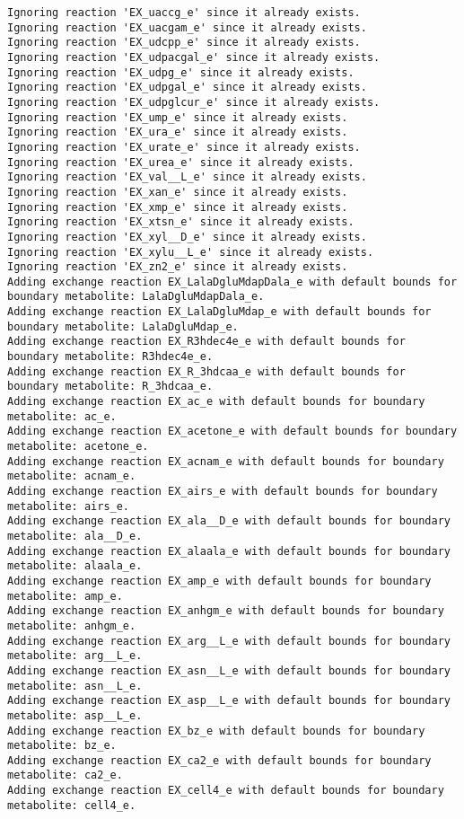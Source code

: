 \documentclass[
  letterpaper,
  DIV=11,
  numbers=noendperiod]{scrartcl}
\begin{document}
\begin{verbatim}
Ignoring reaction 'EX_uaccg_e' since it already exists.
Ignoring reaction 'EX_uacgam_e' since it already exists.
Ignoring reaction 'EX_udcpp_e' since it already exists.
Ignoring reaction 'EX_udpacgal_e' since it already exists.
Ignoring reaction 'EX_udpg_e' since it already exists.
Ignoring reaction 'EX_udpgal_e' since it already exists.
Ignoring reaction 'EX_udpglcur_e' since it already exists.
Ignoring reaction 'EX_ump_e' since it already exists.
Ignoring reaction 'EX_ura_e' since it already exists.
Ignoring reaction 'EX_urate_e' since it already exists.
Ignoring reaction 'EX_urea_e' since it already exists.
Ignoring reaction 'EX_val__L_e' since it already exists.
Ignoring reaction 'EX_xan_e' since it already exists.
Ignoring reaction 'EX_xmp_e' since it already exists.
Ignoring reaction 'EX_xtsn_e' since it already exists.
Ignoring reaction 'EX_xyl__D_e' since it already exists.
Ignoring reaction 'EX_xylu__L_e' since it already exists.
Ignoring reaction 'EX_zn2_e' since it already exists.
Adding exchange reaction EX_LalaDgluMdapDala_e with default bounds for boundary metabolite: LalaDgluMdapDala_e.
Adding exchange reaction EX_LalaDgluMdap_e with default bounds for boundary metabolite: LalaDgluMdap_e.
Adding exchange reaction EX_R3hdec4e_e with default bounds for boundary metabolite: R3hdec4e_e.
Adding exchange reaction EX_R_3hdcaa_e with default bounds for boundary metabolite: R_3hdcaa_e.
Adding exchange reaction EX_ac_e with default bounds for boundary metabolite: ac_e.
Adding exchange reaction EX_acetone_e with default bounds for boundary metabolite: acetone_e.
Adding exchange reaction EX_acnam_e with default bounds for boundary metabolite: acnam_e.
Adding exchange reaction EX_airs_e with default bounds for boundary metabolite: airs_e.
Adding exchange reaction EX_ala__D_e with default bounds for boundary metabolite: ala__D_e.
Adding exchange reaction EX_alaala_e with default bounds for boundary metabolite: alaala_e.
Adding exchange reaction EX_amp_e with default bounds for boundary metabolite: amp_e.
Adding exchange reaction EX_anhgm_e with default bounds for boundary metabolite: anhgm_e.
Adding exchange reaction EX_arg__L_e with default bounds for boundary metabolite: arg__L_e.
Adding exchange reaction EX_asn__L_e with default bounds for boundary metabolite: asn__L_e.
Adding exchange reaction EX_asp__L_e with default bounds for boundary metabolite: asp__L_e.
Adding exchange reaction EX_bz_e with default bounds for boundary metabolite: bz_e.
Adding exchange reaction EX_ca2_e with default bounds for boundary metabolite: ca2_e.
Adding exchange reaction EX_cell4_e with default bounds for boundary metabolite: cell4_e.

\end{verbatim}
\end{document}
